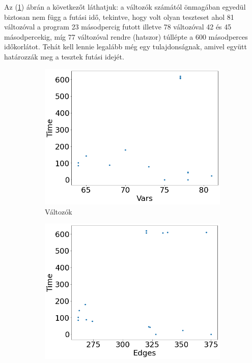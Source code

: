 Az (\ref{fig_ssh_a}) ábrán a következőt láthatjuk: a változók számától önmagában egyedül biztosan nem függ a futási idő, tekintve, hogy volt olyan teszteset ahol 81 változóval a program 23 másodpercig futott illetve 78 változóval 42 és 45 másodpercekig, míg 77 változóval rendre (hatszor) túllépte a 600 másodperces időkorlátot. Tehát kell lennie legalább még egy tulajdonságnak, amivel együtt határozzák meg a tesztek futási idejét.

\begin{figure}[ht] 
	\begin{subfigure}[b]{0.5\linewidth}
		\centering
		\includegraphics[width=0.95\linewidth]{figures/ssh/vars.png} 
		\caption{Változók\label{fig_ssh_a}} 
		\vspace{4ex}
	\end{subfigure}%
	\begin{subfigure}[b]{0.5\linewidth}
		\centering
		\includegraphics[width=0.95\linewidth]{figures/ssh/edges.png} 

\end{subfigure}
\end{figure}
